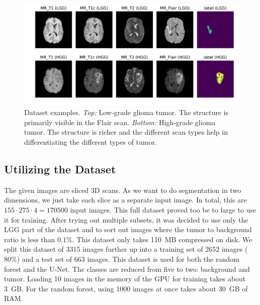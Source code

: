 \documentclass[final]{article}
\begin{document}
\begin{figure}
\centering
\includegraphics[width=0.99\linewidth]{scan_types_both}
\caption{Dataset examples. \textit{Top:} Low-grade glioma tumor. The structure
is primarily visible in the Flair scan. \textit{Bottom:} High-grade glioma
tumor. The structure is richer and the different scan types help in
differentiating the different types of tumor.}
\label{fig:dataex}
\end{figure}

\subsection{Utilizing the Dataset}
The given images are sliced 3D scans. As we want to do segmentation in two
dimensions, we just take each slice as a separate input image. In total, this
are $155\cdot275\cdot4 = 170500$ input images. This full dataset proved too be
to large to use it for training. After trying out multiple subsets, it was
decided to use only the LGG part of the dataset and to sort out images where
the tumor to background ratio is less than $0.1\%$. This dataset only takes
\SI{110}{MB} compressed on disk. We split this dataset of 3315 images further
up into a training set of 2652 images ($80\%$) and a test set of 663 images.
This dataset is used for both the random forest and the U-Net. The classes are
reduced from five to two: background and tumor. Loading 10 images in the memory
of the GPU for training takes about \SI{3}{GB}. For the random forest, using
1000 images at once takes about \SI{30}{GB} of RAM.
\end{document}
